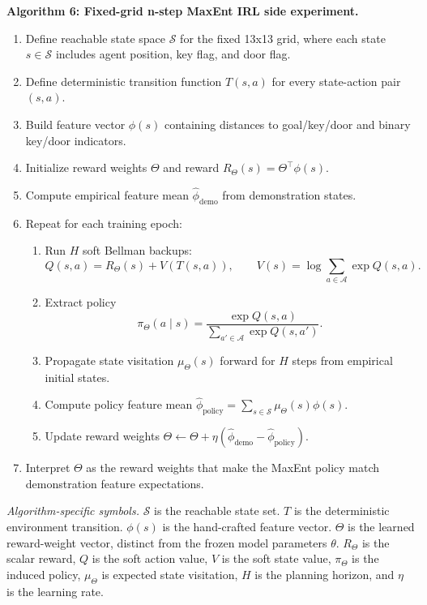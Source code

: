 \documentclass[11pt]{article}
\begin{document}
\medskip
\noindent\textbf{Algorithm 6: Fixed-grid n-step MaxEnt IRL side experiment.}
\begin{enumerate}[leftmargin=*,itemsep=1pt,topsep=2pt]
  \item Define reachable state space $\mathcal{S}$ for the fixed 13x13 grid, where each state $s\in\mathcal{S}$ includes agent position, key flag, and door flag.
  \item Define deterministic transition function $T(s,a)$ for every state-action pair $(s,a)$.
  \item Build feature vector $\phi(s)$ containing distances to goal/key/door and binary key/door indicators.
  \item Initialize reward weights $\Theta$ and reward $R_\Theta(s)=\Theta^\top\phi(s)$.
  \item Compute empirical feature mean $\hat{\phi}_{\mathrm{demo}}$ from demonstration states.
  \item Repeat for each training epoch:
    \begin{enumerate}[leftmargin=1.5em,itemsep=1pt,topsep=1pt]
      \item Run $H$ soft Bellman backups:
      \[
        Q(s,a)=R_\Theta(s)+V(T(s,a)),\qquad
        V(s)=\log\sum_{a\in\mathcal{A}}\exp Q(s,a).
      \]
      \item Extract policy
      \[
        \pi_\Theta(a\mid s)=
        \frac{\exp Q(s,a)}
        {\sum_{a'\in\mathcal{A}}\exp Q(s,a')}.
      \]
      \item Propagate state visitation $\mu_\Theta(s)$ forward for $H$ steps from empirical initial states.
      \item Compute policy feature mean $\hat{\phi}_{\mathrm{policy}}=\sum_{s\in\mathcal{S}}\mu_\Theta(s)\phi(s)$.
      \item Update reward weights $\Theta\leftarrow\Theta+\eta(\hat{\phi}_{\mathrm{demo}}-\hat{\phi}_{\mathrm{policy}})$.
    \end{enumerate}
  \item Interpret $\Theta$ as the reward weights that make the MaxEnt policy match demonstration feature expectations.
\end{enumerate}
\noindent\emph{Algorithm-specific symbols.}
$\mathcal{S}$ is the reachable state set.
$T$ is the deterministic environment transition.
$\phi(s)$ is the hand-crafted feature vector.
$\Theta$ is the learned reward-weight vector, distinct from the frozen model parameters $\theta$.
$R_\Theta$ is the scalar reward, $Q$ is the soft action value, $V$ is the soft state value, $\pi_\Theta$ is the induced policy, $\mu_\Theta$ is expected state visitation, $H$ is the planning horizon, and $\eta$ is the learning rate.
\end{document}

